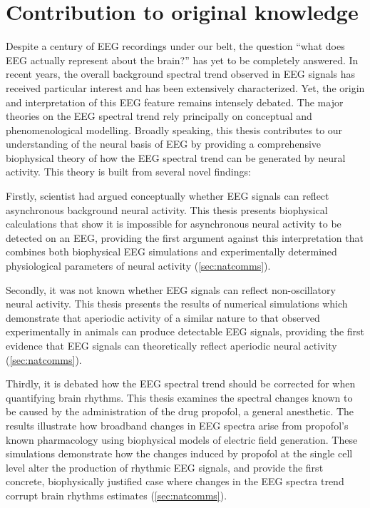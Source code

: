 \chapter*{Contribution to original knowledge}
\renewcommand{\chapterautorefname}{Chapter}

Despite a century of EEG recordings under our belt, the question ``what does EEG actually represent about the brain?'' has yet to be completely answered. In recent years, the overall background spectral trend observed in EEG signals has received particular interest and has been extensively characterized. Yet, the origin and interpretation of this EEG feature remains intensely debated. The major theories on the EEG spectral trend rely principally on conceptual and phenomenological modelling. Broadly speaking, this thesis contributes to our understanding of the neural basis of EEG by providing a comprehensive biophysical theory of how the EEG spectral trend can be generated by neural activity. This theory is built from several novel findings:

Firstly, scientist had argued conceptually whether EEG signals can reflect asynchronous background neural activity. This thesis presents biophysical calculations that show it is impossible for asynchronous neural activity to be detected on an EEG, providing the first argument against this interpretation that combines both biophysical EEG simulations and experimentally determined physiological parameters of neural activity (\autoref{sec:natcomms}). 

Secondly, it was not known whether EEG signals can reflect non-oscillatory neural activity. This thesis presents the results of numerical simulations which demonstrate that aperiodic activity of a similar nature to that observed experimentally in animals can produce detectable EEG signals, providing the first evidence that EEG signals can theoretically reflect aperiodic neural activity (\autoref{sec:natcomms}).

Thirdly, it is debated how the EEG spectral trend should be corrected for when quantifying brain rhythms. This thesis examines the spectral changes known to be caused by the administration of the drug propofol, a general anesthetic. The results illustrate how broadband changes in EEG spectra arise from propofol's known pharmacology using biophysical models of electric field generation. These simulations demonstrate how the changes induced by propofol at the single cell level alter the production of rhythmic EEG signals, and provide the first concrete, biophysically justified case where changes in the EEG spectra trend corrupt brain rhythms estimates (\autoref{sec:natcomms}).

